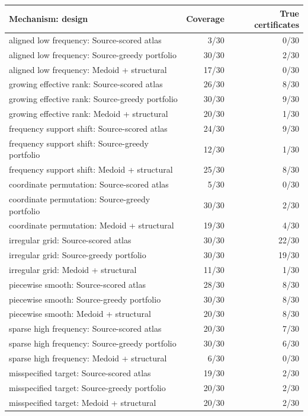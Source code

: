 \begin{tabular}{lrr}
\toprule
Mechanism: design & Coverage & True certificates \\
\midrule
aligned low frequency: Source-scored atlas & 3/30 & 0/30 \\
aligned low frequency: Source-greedy portfolio & 30/30 & 2/30 \\
aligned low frequency: Medoid + structural & 17/30 & 0/30 \\
growing effective rank: Source-scored atlas & 26/30 & 8/30 \\
growing effective rank: Source-greedy portfolio & 30/30 & 9/30 \\
growing effective rank: Medoid + structural & 20/30 & 1/30 \\
frequency support shift: Source-scored atlas & 24/30 & 9/30 \\
frequency support shift: Source-greedy portfolio & 12/30 & 1/30 \\
frequency support shift: Medoid + structural & 25/30 & 8/30 \\
coordinate permutation: Source-scored atlas & 5/30 & 0/30 \\
coordinate permutation: Source-greedy portfolio & 30/30 & 2/30 \\
coordinate permutation: Medoid + structural & 19/30 & 4/30 \\
irregular grid: Source-scored atlas & 30/30 & 22/30 \\
irregular grid: Source-greedy portfolio & 30/30 & 19/30 \\
irregular grid: Medoid + structural & 11/30 & 1/30 \\
piecewise smooth: Source-scored atlas & 28/30 & 8/30 \\
piecewise smooth: Source-greedy portfolio & 30/30 & 8/30 \\
piecewise smooth: Medoid + structural & 20/30 & 8/30 \\
sparse high frequency: Source-scored atlas & 20/30 & 7/30 \\
sparse high frequency: Source-greedy portfolio & 30/30 & 6/30 \\
sparse high frequency: Medoid + structural & 6/30 & 0/30 \\
misspecified target: Source-scored atlas & 19/30 & 2/30 \\
misspecified target: Source-greedy portfolio & 20/30 & 2/30 \\
misspecified target: Medoid + structural & 20/30 & 2/30 \\
\bottomrule
\end{tabular}
